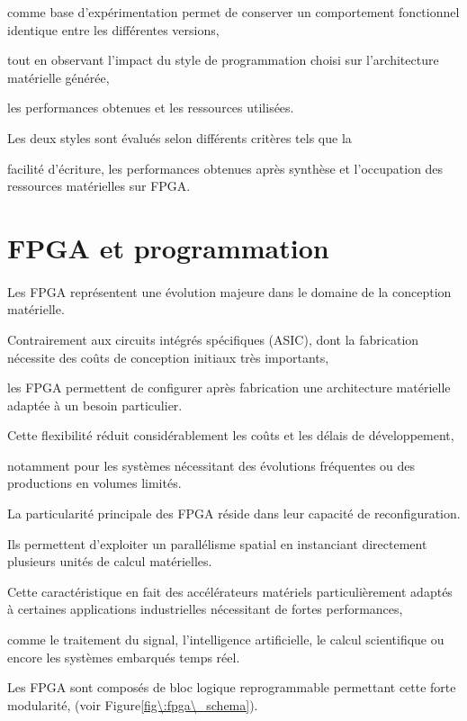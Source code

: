 \documentclass{article}
\begin{document}
comme base d'expérimentation permet de conserver un comportement fonctionnel identique entre les différentes versions, 

tout en observant l'impact du style de programmation choisi sur l'architecture matérielle générée, 

les performances obtenues et les ressources utilisées.

Les deux styles sont évalués selon différents critères tels que la 

facilité d'écriture, les performances obtenues après synthèse et l'occupation des ressources matérielles sur FPGA.


\newpage

\section{FPGA et programmation}

\paragraph{} Les FPGA représentent une évolution majeure dans le domaine de la conception matérielle. 

Contrairement aux circuits intégrés spécifiques (ASIC), dont la fabrication nécessite des coûts de conception initiaux très importants, 

les FPGA permettent de configurer après fabrication une architecture matérielle adaptée à un besoin particulier. 

Cette flexibilité réduit considérablement les coûts et les délais de développement, 

notamment pour les systèmes nécessitant des évolutions fréquentes ou des productions en volumes limités.

La particularité principale des FPGA réside dans leur capacité de reconfiguration. 

Ils permettent d'exploiter un parallélisme spatial en instanciant directement plusieurs unités de calcul matérielles.

Cette caractéristique en fait des accélérateurs matériels particulièrement adaptés à certaines applications industrielles nécessitant de fortes performances, 

comme le traitement du signal, l'intelligence artificielle, le calcul scientifique ou encore les systèmes embarqués temps réel.

Les FPGA sont composés de bloc logique reprogrammable permettant cette forte modularité, (voir Figure\~\ref{fig\:fpga\_schema}).
\end{document}
